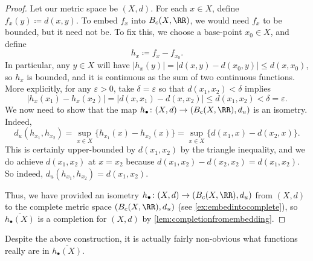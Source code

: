 \documentclass[../notes.tex]{subfiles}
\begin{document}
\begin{proof}
	Let our metric space be $(X,d)$. For each $x\in X$, define $f_x(y)\coloneqq d(x,y)$. To embed $f_x$ into $B_c(X,\RR)$, we would need $f_x$ to be bounded, but it need not be. To fix this, we choose a base-point $x_0\in X$, and define
	\[h_x\coloneqq f_x-f_{x_0}.\]
	In particular, any $y\in X$ will have $|h_x(y)|=|d(x,y)-d(x_0,y)|\le d(x,x_0)$, so $h_x$ is bounded, and it is continuous as the sum of two continuous functions. More explicitly, for any $\varepsilon>0$, take $\delta=\varepsilon$ so that $d(x_1,x_2)<\delta$ implies
	\[|h_x(x_1)-h_x(x_2)|=|d(x,x_1)-d(x,x_2)|\le d(x_1,x_2)<\delta=\varepsilon.\]
	We now need to show that the map $h_\bullet\colon(X,d)\to(B_c(X,\RR),d_u)$ is an isometry. Indeed,
	\[d_u\left(h_{x_1},h_{x_2}\right)=\sup_{x\in X}\{h_{x_1}(x)-h_{x_2}(x)\}=\sup_{x\in X}\{d(x_1,x)-d(x_2,x)\}.\]
	This is certainly upper-bounded by $d(x_1,x_2)$ by the triangle inequality, and we do achieve $d(x_1,x_2)$ at $x=x_2$ because $d(x_1,x_2)-d(x_2,x_2)=d(x_1,x_2)$. So indeed, $d_u(h_{x_1},h_{x_2})=d(x_1,x_2)$.

	Thus, we have provided an isometry $h_\bullet\colon(X,d)\to(B_c(X,\RR),d_u)$ from $(X,d)$ to the complete metric space $(B_c(X,\RR),d_u)$ (see \autoref{ex:embedintocomplete}), so $\overline{h_\bullet(X)}$ is a completion for $(X,d)$ by \autoref{lem:completionfromembedding}.
\end{proof}
\begin{remark}
	Despite the above construction, it is actually fairly non-obvious what functions really are in $\overline{h_\bullet(X)}$.
\end{remark}
\end{document}
